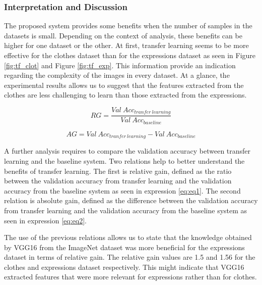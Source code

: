 \documentclass{article}
\begin{document}
\subsubsection{\textbf{Interpretation and Discussion}}

The proposed system provides some benefits when the number of samples in the datasets is small. Depending on the context of analysis, these benefits can be higher for one dataset or the other. At first, transfer learning seems to be more effective for the clothes dataset than for the expressions dataset as seen in Figure \ref{fig:tf_clot} and Figure \ref{fig:tf_exp}. This information provide an indication regarding the complexity of the images in every dataset. At a glance, the experimental results allows us to suggest that the features extracted from the clothes are less challenging to learn than those extracted from the expressions.

\begin{equation}
	RG = \frac{Val\ Acc_{tranfer\ learning}}{Val\ Acc_{baseline}}
	\label{eq:eq1}
\end{equation}

	


\begin{equation}
	AG = Val\ Acc_{tranfer\ learning} - Val\ Acc_{baseline}
	\label{eq:eq2}
\end{equation}




A further analysis requires to compare the validation accuracy between transfer learning and the baseline system. Two relations help to better understand the benefits of transfer learning. The first is relative gain, defined as the ratio between the validation accuracy from transfer learning and the validation accuracy from the baseline system as seen in expression \ref{eq:eq1}. The second relation is absolute gain, defined as the difference between the validation accuracy from transfer learning and the validation accuracy from the baseline system as seen in expression \ref{eq:eq2}.

The use of the previous relations allows us to state that the knowledge obtained by VGG16 from the ImageNet dataset was more beneficial for the expressions dataset in terms of relative gain. The relative gain values are 1.5 and 1.56 for the clothes and expressions dataset respectively. This might indicate that VGG16 extracted features that were more relevant for expressions rather than for clothes.
\end{document}
